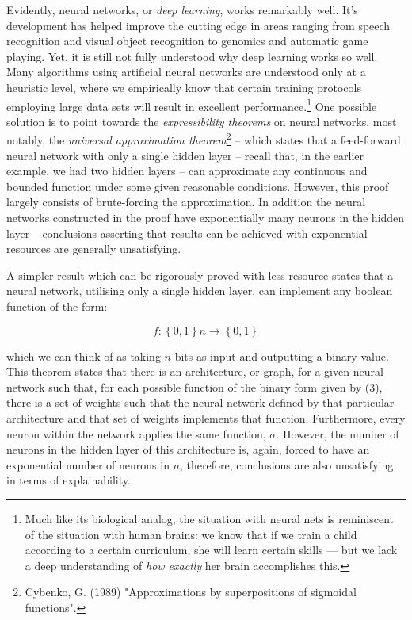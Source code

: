 \documentclass[11pt]{article}
\begin{document}
Evidently, neural networks, or \textit{deep learning}, works remarkably well. It's development has helped improve the cutting edge in areas ranging from speech recognition and visual object recognition to genomics and automatic game playing. Yet, it is still not fully understood why deep learning works so well. Many algorithms using artificial neural networks are understood only at a heuristic level, where we empirically know that certain training protocols employing large data sets will result in excellent performance.\footnote{Much like its biological analog, the situation with neural nets is reminiscent of the situation with human brains: we know that if we train a child according to a certain curriculum, she will learn
certain skills — but we lack a deep understanding of \textit{how exactly} her brain accomplishes this.} One possible solution is to point towards the \textit{expressibility theorems} on neural networks, most notably, the \textit{universal approximation theorem}\footnote{Cybenko, G. (1989) "Approximations by superpositions of sigmoidal functions".} – which states that a feed-forward neural network with only a single hidden layer -- recall that, in the earlier example, we had two hidden layers -- can approximate any continuous and bounded function under some given reasonable conditions. However, this proof largely consists of brute-forcing the approximation. In addition the neural networks constructed in the proof have exponentially many neurons in the hidden layer – conclusions asserting that results can be achieved with exponential resources are generally unsatisfying.

A simpler result which can be rigorously proved with less resource states that a neural network, utilising only a single hidden layer, can implement any boolean function of the form:


\begin{equation}f: \left \{ 0,1 \right \}n \rightarrow  \left \{ 0,1 \right \} \end{equation}

which we can think of as taking $n$ bits as input and outputting a binary value. This theorem states that there is an architecture, or graph, for a given neural network such that, for each possible function of the binary form given by (3), there is a set of weights such that the neural network defined by that particular architecture and that set of weights implements that function. Furthermore, every neuron within the network applies the same function, $\sigma$. However, the number of neurons in the hidden layer of this architecture is, again, forced to have an exponential number of neurons in $n$, therefore, conclusions are also unsatisfying in terms of explainability.
\end{document}
